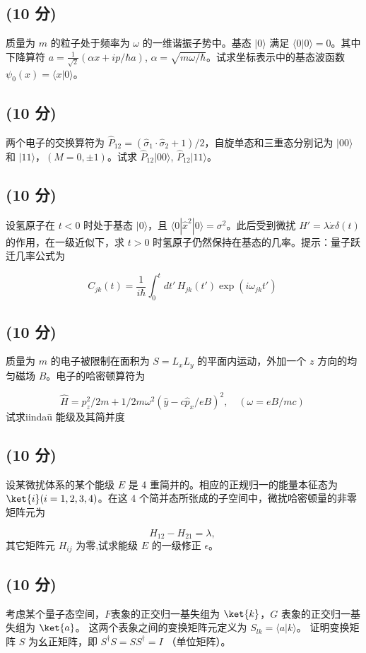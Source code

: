 \subsection{(10 分)}质量为 $m$ 的粒子处于频率为 $\omega$ 的一维谐振子势中。基态 $|0\rangle$ 满足 $\langle 0| 0\rangle = 0$。其中下降算符 $a = \frac{1}{\sqrt{2}} (\alpha x + ip/\hbar a)$, $\alpha = \sqrt{m\omega/\hbar}$。试求坐标表示中的基态波函数 $\psi_0(x) = \langle x| 0\rangle$。

\subsection{(10 分)}两个电子的交换算符为 $\hat{P}_{12} = (\hat{\sigma}_1\cdot \hat{\sigma}_2+1)/2$，自旋单态和三重态分别记为 $|00\rangle$ 和 $|11\rangle$，$(M = 0, \pm1)$。试求 $\hat{P}_{12}|00\rangle$, $\hat{P}_{12}|11\rangle$。

\subsection{(10 分)}设氢原子在 $t<0$ 时处于基态 $|0\rangle$，且 $\langle 0| \hat{x}^2 | 0\rangle = \sigma^2$。此后受到微扰 $H' = \lambda \dot{x} \delta(t)$ 的作用，在一级近似下，求 $t>0$ 时氢原子仍然保持在基态的几率。提示：量子跃迁几率公式为

$$C_{jk}(t) = \frac{1}{i\hbar} \int_0^t dt' \, H_{jk}(t') \exp(i\omega_{jk} t')~$$

\subsection{(10 分)}质量为 $m$ 的电子被限制在面积为 $S=L_x L_y$ 的平面内运动，外加一个 $z$ 方向的均匀磁场 $B$。电子的哈密顿算符为

$$\hat{H} = p_z^2/2m + 1/2m \omega^2\left(\hat{y}-c\hat{p}_x/eB\right)^2, \quad (\omega = eB/mc)~$$
试求iindaū 能级及其简并度

\subsection{(10 分)}设某微扰体系的某个能级 $E$ 是 4 重简并的。相应的正规归一的能量本征态为 $\ket{i} (i=1,2,3,4)$。在这 4 个简并态所张成的子空间中，微扰哈密顿量的非零矩阵元为

$$H_{12} - H_{21} = \lambda,~$$其它矩阵元 $H_{ij}$ 为零,试求能级 $E$ 的一级修正 $\epsilon$。

\subsection{(10 分)}考虑某个量子态空间，$F$表象的正交归一基失组为 $\ket{k}$，$G$ 表象的正交归一基失组为 $\ket{a}$。 这两个表象之间的变换矩阵元定义为 $S_{lk} = \langle a | k \rangle$。 证明变换矩阵 $S$ 为幺正矩阵，即 $S^\dagger S = S S^\dagger = I$ （单位矩阵）。
